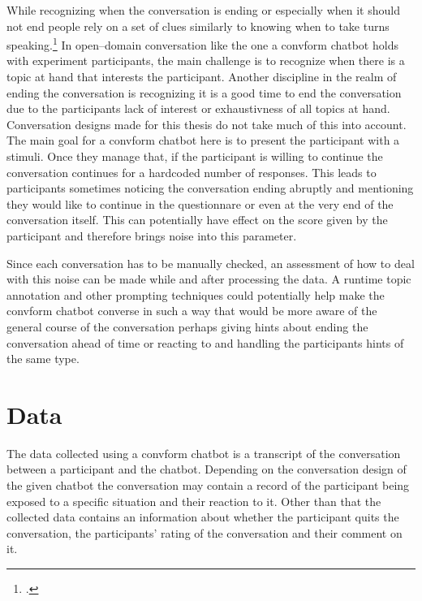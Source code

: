 \documentclass[12pt]{report}
\begin{document}
{While recognizing when the conversation is ending
or especially when it should not end
people rely on a set of clues
similarly to knowing when to take turns speaking.\footcite{closing1,davidson1975ending,coppock2005politeness}
In open–domain conversation
like the one a convform chatbot holds with experiment participants,
the main challenge is to recognize
when there is a topic at hand
that interests the participant.
Another discipline in the realm of ending the conversation
is recognizing it is a good time to end the conversation
due to the participants lack of interest or exhaustivness of all topics at hand.
Conversation designs made for this thesis
do not take much of this into account.
The main goal for a convform chatbot here
is to present the participant with a stimuli.
Once they manage that,
if the participant is willing to continue
the conversation continues for a hardcoded number of responses.
This leads to participants sometimes noticing
the conversation ending abruptly
and mentioning they would like to continue
in the questionnare
or even at the very end of the conversation itself.
This can potentially have effect on
the score given by the participant
and therefore brings noise into this parameter.

\par
Since each conversation has to be manually checked,
an assessment of how to deal with this noise can be made
while and after processing the data.
A runtime topic annotation
and other prompting techniques
could potentially help make
the convform chatbot converse in such a way
that would be more aware of the general course of the conversation
perhaps giving hints about ending the conversation ahead of time
or reacting to and handling the participants hints of the same type.

\chapter{Data}

The data collected using a convform chatbot
is a transcript of the conversation
between a participant and the chatbot.
Depending on the conversation design of the given chatbot
the conversation may contain a record of
the participant being exposed to a specific situation
and their reaction to it.
Other than that the collected data contains
an information about whether the participant quits the conversation,
the participants' rating of the conversation
and their comment on it.

}
\end{document}
